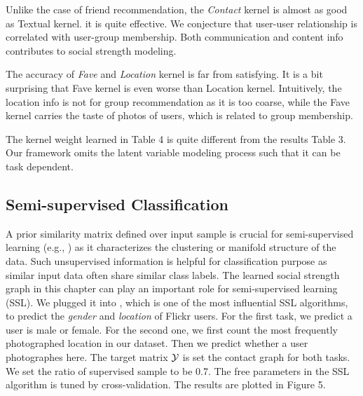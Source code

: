 Unlike the case of friend recommendation, the {\em Contact} kernel is almost as good as Textual kernel. it is quite effective. We conjecture that user-user
relationship is correlated with user-group membership. Both communication and content info contributes to social strength modeling.

The accuracy of {\em Fave} and {\em Location} kernel is far from satisfying. It is a bit surprising that Fave kernel is even worse than Location kernel.
Intuitively, the location info is not for group recommendation as it is too coarse, while the Fave kernel carries the taste of photos of users, which is related
to group membership.

The kernel weight learned in Table 4 is quite different from the results Table 3. Our framework omits the latent variable modeling process such that it can be
task dependent.

\subsection{Semi-supervised Classification}

A prior similarity matrix defined over input sample is crucial for semi-supervised learning (e.g., \cite{icml/ZhuGL03,nips/ZhuKGL04,nips/ZhouBLWS05}) as it
characterizes the clustering or manifold structure of the data. Such unsupervised information is helpful for classification purpose as similar input data often share similar class labels. The learned social strength graph in this chapter can play an important role for semi-supervised learning (SSL). We plugged it into \cite{icml/ZhuGL03}, which is one of the most influential SSL algorithms, to predict the {\em gender} and {\em location} of Flickr users. For the first task, we predict a user is male or female. For the second one, we first count the most frequently photographed location in our dataset. Then we predict whether a user photographes here. The target matrix ${\cal Y}$ is set the contact graph for both tasks. We set the ratio of supervised sample to be 0.7. The free parameters in the SSL algorithm is tuned by cross-validation. The results are plotted in Figure 5.

